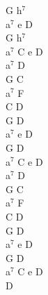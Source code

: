 \documentclass[a5paper, 10pt]{book}
\begin{document}
\begin{minipage}[t]{0.2\textwidth}
G h$^7$\\
a$^7$ e D\\
G h$^7$\\
a$^7$ C e D\\

a$^7$ D\\
G C\\
a$^7$ F\\ 
C  D \\

G D\\
a$^7$ e D\\
G D\\
a$^7$ C e D\\

a$^7$ D\\
G C\\
a$^7$ F\\ 
C  D \\

G D\\
a$^7$ e D\\
G D\\
a$^7$ C e D\\

D\\
\end{minipage}

\newpage
\end{document}
